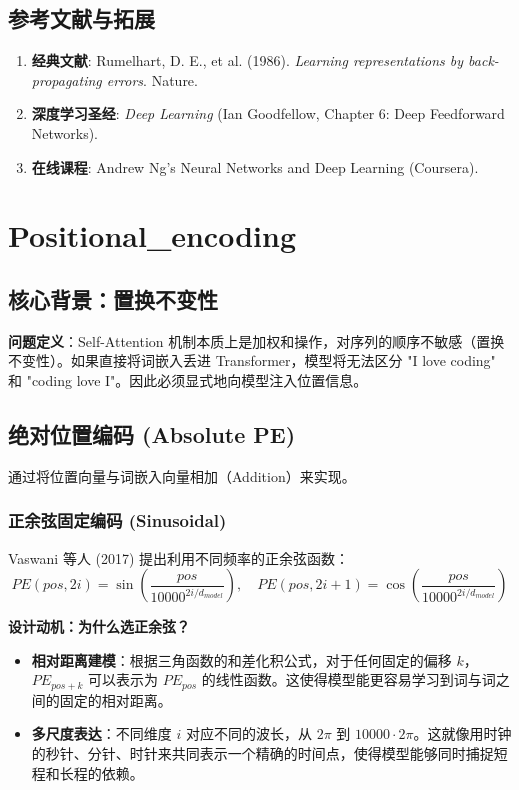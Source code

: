 \documentclass[12pt, a4paper]{book}
\begin{document}
\section{参考文献与拓展}
\begin{enumerate}
    \item \textbf{经典文献}: Rumelhart, D. E., et al. (1986). \textit{Learning representations by back-propagating errors}. Nature.
    \item \textbf{深度学习圣经}: \textit{Deep Learning} (Ian Goodfellow, Chapter 6: Deep Feedforward Networks).
    \item \textbf{在线课程}: Andrew Ng's Neural Networks and Deep Learning (Coursera).
\end{enumerate}

\chapter{Positional\_encoding}


\section{核心背景：置换不变性}
\textbf{问题定义}：Self-Attention 机制本质上是加权和操作，对序列的顺序不敏感（置换不变性）。如果直接将词嵌入丢进 Transformer，模型将无法区分 "I love coding" 和 "coding love I"。因此必须显式地向模型注入位置信息。

\section{绝对位置编码 (Absolute PE)}
通过将位置向量与词嵌入向量相加（Addition）来实现。

\subsection{正余弦固定编码 (Sinusoidal)}
Vaswani 等人 (2017) 提出利用不同频率的正余弦函数：
$$ PE(pos, 2i) = \sin\left(\frac{pos}{10000^{2i/d_{model}}}\right), \quad PE(pos, 2i+1) = \cos\left(\frac{pos}{10000^{2i/d_{model}}}\right) $$

\textbf{设计动机：为什么选正余弦？}
\begin{itemize}
    \item \textbf{相对距离建模}：根据三角函数的和差化积公式，对于任何固定的偏移 $k$，$PE_{pos+k}$ 可以表示为 $PE_{pos}$ 的线性函数。这使得模型能更容易学习到词与词之间的固定的相对距离。
    \item \textbf{多尺度表达}：不同维度 $i$ 对应不同的波长，从 $2\pi$ 到 $10000 \cdot 2\pi$。这就像用时钟的秒针、分针、时针来共同表示一个精确的时间点，使得模型能够同时捕捉短程和长程的依赖。
\end{itemize}
\end{document}
